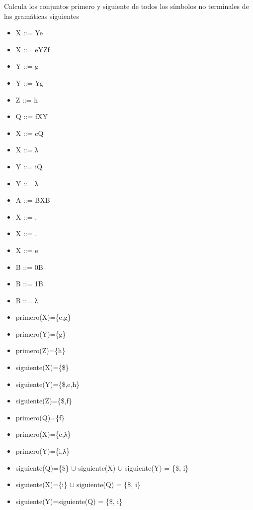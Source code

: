 \begin{problem}
Calcula los conjuntos primero y siguiente de todos los símbolos no terminales de las gramáticas siguientes

\ppart
\begin{itemize}
\item X ::= Ye
\item X ::= eYZf
\item Y ::= g
\item Y ::= Yg
\item Z ::= h
\end{itemize}

\ppart
\begin{itemize}
\item Q ::= fXY
\item X ::= cQ
\item X ::= λ
\item Y ::= iQ
\item Y ::= λ
\end{itemize}

\ppart
\begin{itemize}
\item A ::= BXB
\item X ::= ,
\item X ::= .
\item X ::= e
\item B ::= 0B
\item B ::= 1B
\item B ::= λ
\end{itemize}

\solution
\spart
\begin{itemize}
\item primero(X)=\{e,g\}
\item primero(Y)=\{g\}
\item primero(Z)=\{h\}
\end{itemize}
\begin{itemize}
\item siguiente(X)=\{\$\}
\item siguiente(Y)=\{\$,e,h\}
\item siguiente(Z)=\{\$,f\}
\end{itemize}

\newpage

\spart
\begin{itemize}
\item primero(Q)=\{f\}
\item primero(X)=\{c,λ\}
\item primero(Y)=\{i,λ\}
\end{itemize}
\begin{itemize}
\item siguiente(Q)=\{\$\} $\cup$ siguiente(X) $\cup$ siguiente(Y) = \{\$, i\}
\item siguiente(X)=\{i\} $\cup$ siguiente(Q) = \{\$, i\}
\item siguiente(Y)=siguiente(Q) = \{\$, i\}
\end{itemize}


\end{problem}
